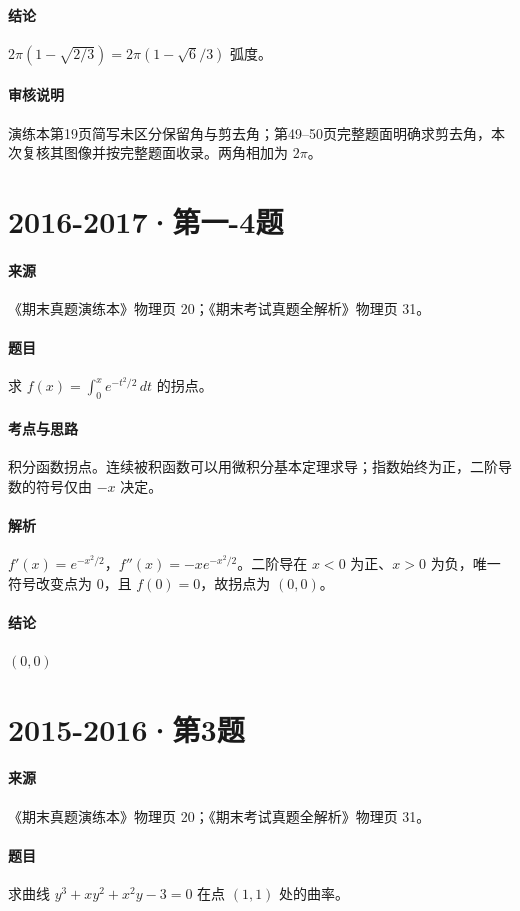 \documentclass[UTF8,fontset=fandol,12pt,oneside,openany]{ctexrep}
\theoremstyle{definition}
\begin{document}
\paragraph{结论}
$2\pi(1-\sqrt{2/3})=2\pi(1-\sqrt6/3)$ 弧度。
\paragraph{审核说明}
演练本第19页简写未区分保留角与剪去角；第49--50页完整题面明确求剪去角，本次复核其图像并按完整题面收录。两角相加为 $2\pi$。

\par\addvspace{18pt}\noindent\begin{minipage}{\linewidth}
\section{2016-2017·第一-4题}
\paragraph{来源}《期末真题演练本》物理页 20；《期末考试真题全解析》物理页 31。
\paragraph{题目}
求 $f(x)=\int_0^x e^{-t^2/2}\,dt$ 的拐点。
\end{minipage}\par
\paragraph{考点与思路}
积分函数拐点。连续被积函数可以用微积分基本定理求导；指数始终为正，二阶导数的符号仅由 $-x$ 决定。
\paragraph{解析}
$f'(x)=e^{-x^2/2}$，$f''(x)=-xe^{-x^2/2}$。二阶导在 $x<0$ 为正、$x>0$ 为负，唯一符号改变点为 $0$，且 $f(0)=0$，故拐点为 $(0,0)$。
\paragraph{结论}
$(0,0)$

\par\addvspace{18pt}\noindent\begin{minipage}{\linewidth}
\section{2015-2016·第3题}
\paragraph{来源}《期末真题演练本》物理页 20；《期末考试真题全解析》物理页 31。
\paragraph{题目}
求曲线 $y^3+xy^2+x^2y-3=0$ 在点 $(1,1)$ 处的曲率。
\end{minipage}\par
\end{document}
